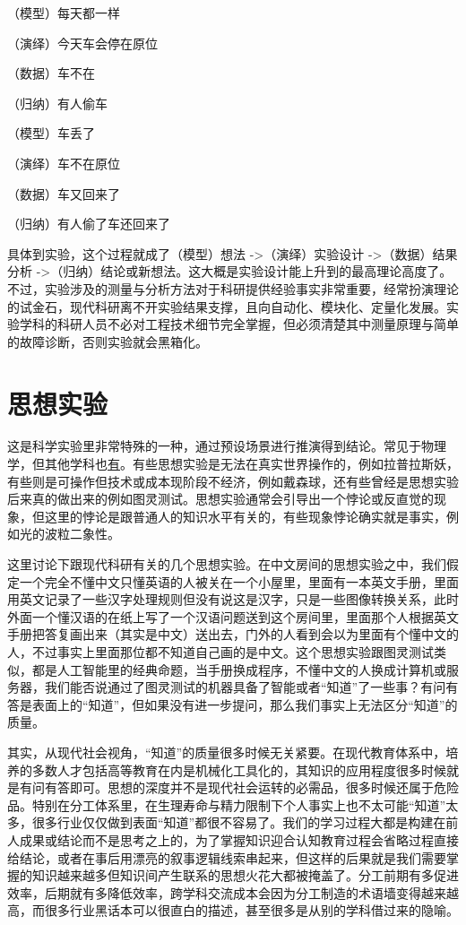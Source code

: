 \documentclass[]{tufte-book}
\begin{document}
（模型）每天都一样

（演绎）今天车会停在原位

（数据）车不在

（归纳）有人偷车

（模型）车丢了

（演绎）车不在原位

（数据）车又回来了

（归纳）有人偷了车还回来了

具体到实验，这个过程就成了（模型）想法 -\textgreater（演绎）实验设计 -\textgreater（数据）结果分析 -\textgreater（归纳）结论或新想法。这大概是实验设计能上升到的最高理论高度了。不过，实验涉及的测量与分析方法对于科研提供经验事实非常重要，经常扮演理论的试金石，现代科研离不开实验结果支撑，且向自动化、模块化、定量化发展。实验学科的科研人员不必对工程技术细节完全掌握，但必须清楚其中测量原理与简单的故障诊断，否则实验就会黑箱化。

\hypertarget{ux601dux60f3ux5b9eux9a8c}{%
\section{思想实验}\label{ux601dux60f3ux5b9eux9a8c}}

这是科学实验里非常特殊的一种，通过预设场景进行推演得到结论。常见于物理学，但其他学科也\href{https://zh.wikipedia.org/wiki/\%E6\%80\%9D\%E6\%83\%B3\%E5\%AF\%A6\%E9\%A9\%97}{有}。有些思想实验是无法在真实世界操作的，例如拉普拉斯妖，有些则是可操作但技术或成本现阶段不经济，例如戴森球，还有些曾经是思想实验后来真的做出来的例如图灵测试。思想实验通常会引导出一个悖论或反直觉的现象，但这里的悖论是跟普通人的知识水平有关的，有些现象悖论确实就是事实，例如光的波粒二象性。

这里讨论下跟现代科研有关的几个思想实验。在中文房间的思想实验之中，我们假定一个完全不懂中文只懂英语的人被关在一个小屋里，里面有一本英文手册，里面用英文记录了一些汉字处理规则但没有说这是汉字，只是一些图像转换关系，此时外面一个懂汉语的在纸上写了一个汉语问题送到这个房间里，里面那个人根据英文手册把答复画出来（其实是中文）送出去，门外的人看到会以为里面有个懂中文的人，不过事实上里面那位都不知道自己画的是中文。这个思想实验跟图灵测试类似，都是人工智能里的经典命题，当手册换成程序，不懂中文的人换成计算机或服务器，我们能否说通过了图灵测试的机器具备了智能或者``知道''了一些事？有问有答是表面上的``知道''，但如果没有进一步提问，那么我们事实上无法区分``知道''的质量。

其实，从现代社会视角，``知道''的质量很多时候无关紧要。在现代教育体系中，培养的多数人才包括高等教育在内是机械化工具化的，其知识的应用程度很多时候就是有问有答即可。思想的深度并不是现代社会运转的必需品，很多时候还属于危险品。特别在分工体系里，在生理寿命与精力限制下个人事实上也不太可能``知道''太多，很多行业仅仅做到表面``知道''都很不容易了。我们的学习过程大都是构建在前人成果或结论而不是思考之上的，为了掌握知识迎合认知教育过程会省略过程直接给结论，或者在事后用漂亮的叙事逻辑线索串起来，但这样的后果就是我们需要掌握的知识越来越多但知识间产生联系的思想火花大都被掩盖了。分工前期有多促进效率，后期就有多降低效率，跨学科交流成本会因为分工制造的术语墙变得越来越高，而很多行业黑话本可以很直白的描述，甚至很多是从别的学科借过来的隐喻。
\end{document}
